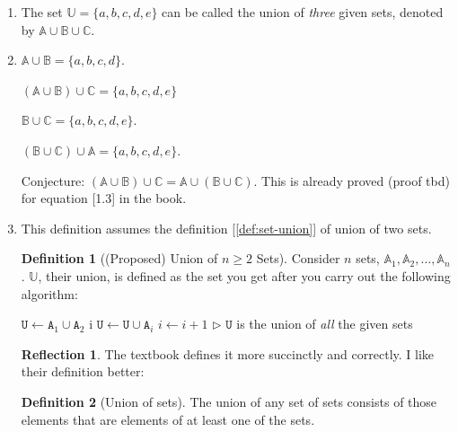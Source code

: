 \documentclass[11pt]{book}
\theoremstyle{definition}
\newtheorem{definition}{Definition}
\theoremstyle{plain}
\theoremstyle{definition}
\theoremstyle{problemstyle}
\theoremstyle{remark}
\theoremstyle{definition}
\newtheorem{reflection}{Reflection}
\begin{document}
    \begin{enumerate}[label={(\alph*)}]
        \item The set $\mathbb{U}=\{a,b,c,d,e\}$ can be called the union of \emph{three} given sets, denoted by $\mathbb{A}\cup\mathbb{B}\cup\mathbb{C}$.
        \item $\mathbb{A}\cup\mathbb{B}=\{a,b,c,d\}$.

            $(\mathbb{A}\cup\mathbb{B})\cup\mathbb{C}=\{a,b,c,d,e\}$

              $\mathbb{B}\cup\mathbb{C}=\{a,b,c,d,e\}$.

              $(\mathbb{B}\cup\mathbb{C})\cup\mathbb{A}=\{a,b,c,d,e\}$.

            Conjecture: $(\mathbb{A}\cup\mathbb{B})\cup\mathbb{C}=\mathbb{A}\cup(\mathbb{B}\cup\mathbb{C})$. This is already proved (proof tbd) for equation [1.3] in the book. 
        \item This definition assumes the definition [\ref{def:set-union}] of union of two sets.

        \begin{definition}[(Proposed) Union of $n\geq2$ Sets]
            Consider $n$ sets, $\mathbb{A}_1,\mathbb{A}_2,\dots,\mathbb{A}_n$. $\mathbb{U}$, their union, is defined as the set you get after you carry out the following algorithm:

            \begin{algorithm}[H]
    \begin{algorithmic}[1] %
        \State $\mathtt{U}\gets\mathtt{A}_1\cup\mathtt{A}_2$
        \State i
             
                \State $\mathtt{U}\gets\mathtt{U}\cup\mathtt{A}_i$
                \State $i\gets i+1$
            \EndWhile\label{loop1}
            \State$\triangleright$ $\mathtt{U}$ is the union of \emph{all} the given sets
    \end{algorithmic}
    \end{algorithm}

        \label{def:set-union-2}
        \end{definition}

        \begin{reflection}
            The textbook defines it more succinctly and correctly. I like their definition better:
            \begin{definition}[Union of sets]
                The union of any set of sets consists of those elements that are elements of at least one of the sets.
            \end{definition}
        \end{reflection}
    \end{enumerate}
\end{document}
